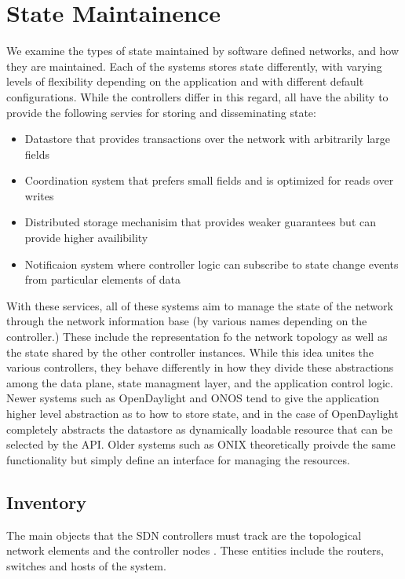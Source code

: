 \documentclass[letterpaper,twocolumn,10pt]{article}
\begin{document}
\section{State Maintainence}

We examine the types of state maintained by software defined networks, and how they are maintained. Each of the systems stores state differently, with varying levels of flexibility depending on the application and with different default configurations. While the controllers differ in this regard, all have the ability to provide the following servies for storing and disseminating state:

\begin{itemize}
\item Datastore that provides transactions over the network with arbitrarily large fields
\item Coordination system that prefers small fields and is optimized for reads over writes
\item Distributed storage mechanisim that provides weaker guarantees but can provide higher availibility
\item Notificaion system where controller logic can subscribe to state change events from particular elements of data
\end{itemize}

With these services, all of these systems aim to manage the state of the network through the network information base (by various names depending on the controller.) These include the representation fo the network topology as well as the state shared by the other controller instances. While this idea unites the various controllers, they behave differently in how they divide these abstractions among the data plane, state managment layer, and the application control
logic. Newer systems such as OpenDaylight and ONOS tend to give the application higher level abstraction as to how to store state, and in the case of OpenDaylight completely abstracts the datastore as dynamically loadable resource that can be selected by the API. Older systems such as ONIX theoretically proivde the same functionality but simply define an interface for managing the resources. 


\subsection*{Inventory}

The main objects that the SDN controllers must track are the topological network elements and the controller nodes \cite{network2015topologies}. These entities include the routers, switches and hosts of the system.
\end{document}
